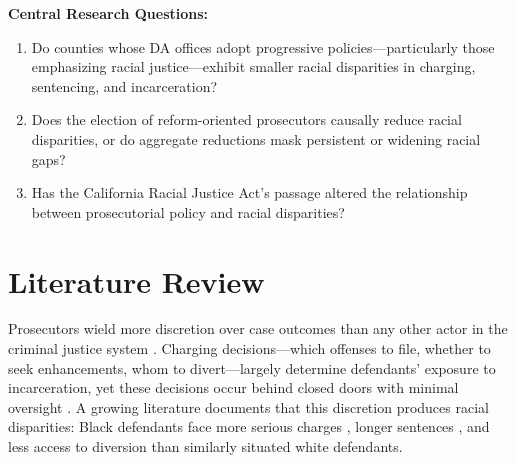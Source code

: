 \documentclass[12pt]{article}
\begin{document}
\textbf{Central Research Questions:}
\begin{enumerate}
    \item Do counties whose DA offices adopt progressive policies---particularly those emphasizing racial justice---exhibit smaller racial disparities in charging, sentencing, and incarceration?
    \item Does the election of reform-oriented prosecutors causally reduce racial disparities, or do aggregate reductions mask persistent or widening racial gaps?
    \item Has the California Racial Justice Act's passage altered the relationship between prosecutorial policy and racial disparities?
\end{enumerate}

\section{Literature Review}

Prosecutors wield more discretion over case outcomes than any other actor in the criminal justice system \citep{pfaff2017,davis2007}. Charging decisions---which offenses to file, whether to seek enhancements, whom to divert---largely determine defendants' exposure to incarceration, yet these decisions occur behind closed doors with minimal oversight \citep{sklansky2018}. A growing literature documents that this discretion produces racial disparities: Black defendants face more serious charges \citep{rehavi2014}, longer sentences \citep{ussc2017}, and less access to diversion \citep{kutateladze2014} than similarly situated white defendants.
\end{document}
